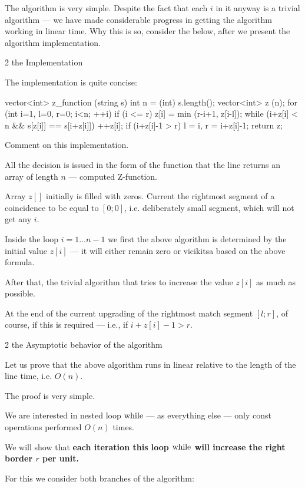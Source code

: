 The algorithm is very simple. Despite the fact that each $i$ in it anyway is a trivial algorithm --- we have made considerable progress in getting the algorithm working in linear time. Why this is so, consider the below, after we present the algorithm implementation.


\h2{ the Implementation }

The implementation is quite concise:

\code
vector<int> z_function (string s) {
int n = (int) s.length();
vector<int> z (n);
for (int i=1, l=0, r=0; i<n; ++i) {
if (i <= r)
z[i] = min (r-i+1, z[i-l]);
while (i+z[i] < n && s[z[i]] == s[i+z[i]])
++z[i];
if (i+z[i]-1 > r)
l = i, r = i+z[i]-1;
}
return z;
}
\endcode

Comment on this implementation.

All the decision is issued in the form of the function that the line returns an array of length $n$ --- computed Z-function.

Array $z[]$ initially is filled with zeros. Current the rightmost segment of a coincidence to be equal to $[0;0]$, i.e. deliberately small segment, which will not get any $i$.

Inside the loop $i = 1 \ldots n-1$ we first the above algorithm is determined by the initial value $z[i]$ --- it will either remain zero or vicikitsa based on the above formula.

After that, the trivial algorithm that tries to increase the value $z[i]$ as much as possible.

At the end of the current upgrading of the rightmost match segment $[l;r]$, of course, if this is required --- i.e., if $i+z[i]-1 > r$.


\h2{ the Asymptotic behavior of the algorithm }

Let us prove that the above algorithm runs in linear relative to the length of the line time, i.e. $O (n)$.

The proof is very simple.

We are interested in nested loop $\rm while$ --- as everything else --- only const operations performed $O (n)$ times.

We will show that \bf{each iteration} this loop $\rm while$ will increase the right border $r$ per unit.

For this we consider both branches of the algorithm:

